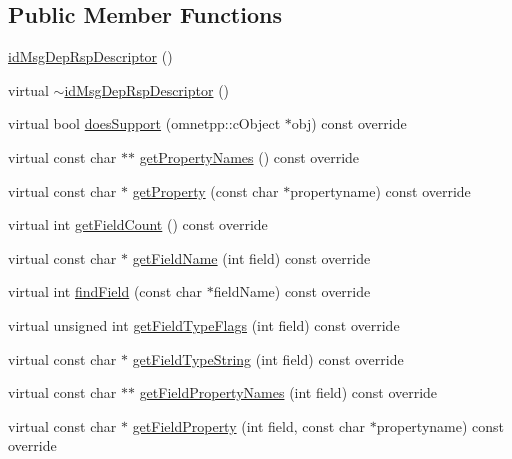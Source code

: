 \subsection*{Public Member Functions}
\begin{DoxyCompactItemize}
\item 
\hyperlink{classidMsgDepRspDescriptor_abedc396206c401b49a270bdc1bce5005}{id\+Msg\+Dep\+Rsp\+Descriptor} ()
\item 
virtual \hyperlink{classidMsgDepRspDescriptor_acd48feffd371854f0d17b7201b672adf}{$\sim$id\+Msg\+Dep\+Rsp\+Descriptor} ()
\item 
virtual bool \hyperlink{classidMsgDepRspDescriptor_a5e341b089472aeeb8a4854a7f4680794}{does\+Support} (omnetpp\+::c\+Object $\ast$obj) const override
\item 
virtual const char $\ast$$\ast$ \hyperlink{classidMsgDepRspDescriptor_ac0d3a1bc5b63ebd0b88971dd6e2e2916}{get\+Property\+Names} () const override
\item 
virtual const char $\ast$ \hyperlink{classidMsgDepRspDescriptor_a241bcfafb380d863d82e281b53c569d5}{get\+Property} (const char $\ast$propertyname) const override
\item 
virtual int \hyperlink{classidMsgDepRspDescriptor_acac56df86dc592e4f75bfe669fbe7f4f}{get\+Field\+Count} () const override
\item 
virtual const char $\ast$ \hyperlink{classidMsgDepRspDescriptor_adf1d3fbc7cac0f37939843ba3ebfcbe7}{get\+Field\+Name} (int field) const override
\item 
virtual int \hyperlink{classidMsgDepRspDescriptor_a74b6bf9b08e70b9b91ee3e6765502af3}{find\+Field} (const char $\ast$field\+Name) const override
\item 
virtual unsigned int \hyperlink{classidMsgDepRspDescriptor_a59b8fc18b2af7d74d95780a40e26b199}{get\+Field\+Type\+Flags} (int field) const override
\item 
virtual const char $\ast$ \hyperlink{classidMsgDepRspDescriptor_ad3182b84a62c4607fe30506c392fa8af}{get\+Field\+Type\+String} (int field) const override
\item 
virtual const char $\ast$$\ast$ \hyperlink{classidMsgDepRspDescriptor_a6a44113613dc717a215e94182ca73cb3}{get\+Field\+Property\+Names} (int field) const override
\item 
virtual const char $\ast$ \hyperlink{classidMsgDepRspDescriptor_a522e2185bfa9e8833c180e4753c2f812}{get\+Field\+Property} (int field, const char $\ast$propertyname) const override
\item 

\end{DoxyCompactItemize}

